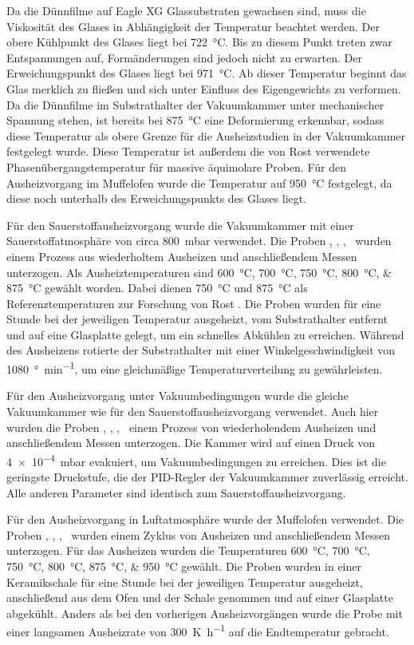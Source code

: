 Da die Dünnfilme auf Eagle XG Glassubstraten gewachsen sind, muss die Viskosität des Glases in Abhängigkeit der
Temperatur beachtet werden.
Der obere Kühlpunkt des Glases liegt bei \qty{722}{\degreeCelsius}.
Bis zu diesem Punkt treten zwar Entspannungen auf, Formänderungen sind jedoch nicht zu erwarten.
Der Erweichungspunkt des Glases liegt bei \qty{971}{\degreeCelsius}.
Ab dieser Temperatur beginnt das Glas merklich zu fließen und sich unter Einfluss des Eigengewichts zu verformen.
Da die Dünnfilme im Substrathalter der Vakuumkammer unter mechanischer Spannung stehen, ist bereits bei
\qty{875}{\degreeCelsius} eine Deformierung erkennbar, sodass diese Temperatur als obere Grenze für die Ausheizstudien
in der Vakuumkammer festgelegt wurde.
Diese Temperatur ist außerdem die von Rost verwendete Phasenübergangstemperatur für massive äquimolare Proben.
\autocite{Rost2015}
Für den Ausheizvorgang im Muffelofen wurde die Temperatur auf \qty{950}{\degreeCelsius} festgelegt, da diese noch
unterhalb des Erweichungspunkts des Glases liegt.

Für den Sauerstoffausheizvorgang wurde die Vakuumkammer mit einer Sauerstoffatmosphäre von circa \qty{800}{\milli\bar}
verwendet.
Die Proben \samplethree, \sampleone, \sampletwo, \samplefour\ wurden einem Prozess aus wiederholtem Ausheizen und
anschließendem Messen unterzogen.
Als Ausheiztemperaturen sind \qtylist{600;700;750;800;875}{\degreeCelsius} gewählt worden.
Dabei dienen \qty{750}{\degreeCelsius} und \qty{875}{\degreeCelsius} als Referenztemperaturen zur Forschung
von Rost \autocite{Rost2015}.
Die Proben wurden für eine Stunde bei der jeweiligen Temperatur ausgeheizt, vom Substrathalter entfernt und auf eine
Glasplatte gelegt, um ein schnelles Abkühlen zu erreichen.
Während des Ausheizens rotierte der Substrathalter mit einer Winkelgeschwindigkeit von
\qty{1080}{\degree\per\minute}, um eine
gleichmäßige Temperaturverteilung zu gewährleisten.

Für den Ausheizvorgang unter Vakuumbedingungen wurde die gleiche Vakuumkammer wie für den Sauerstoffausheizvorgang
verwendet.
Auch hier wurden die Proben \samplethree, \sampleone, \sampletwo, \samplefour\ einem Prozess von wiederholendem
Ausheizen und anschließendem Messen unterzogen.
Die Kammer wird auf einen Druck von \qty{4e-4}{\milli\bar} evakuiert, um Vakuumbedingungen zu erreichen.
Dies ist die geringste Druckstufe, die der PID-Regler der Vakuumkammer zuverlässig erreicht.
Alle anderen Parameter sind identisch zum Sauerstoffausheizvorgang.

Für den Ausheizvorgang in Luftatmosphäre wurde der Muffelofen verwendet.
Die Proben \samplethree, \sampleone, \sampletwo, \samplefour\ wurden einem Zyklus von Ausheizen und anschließendem
Messen unterzogen.
Für das Ausheizen wurden die Temperaturen \qtylist{600;700;750;800;875;950}{\degreeCelsius} gewählt.
Die Proben wurden in einer Keramikschale für eine Stunde bei der jeweiligen Temperatur ausgeheizt, anschließend
aus dem Ofen und der Schale genommen und auf einer Glasplatte abgekühlt.
Anders als bei den vorherigen Ausheizvorgängen wurde die Probe mit einer langsamen Ausheizrate von
\qty{300}{\kelvin\per\hour} auf die Endtemperatur gebracht.

